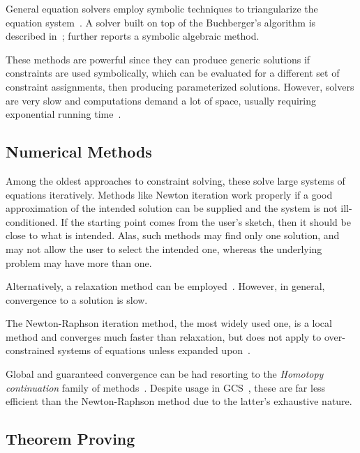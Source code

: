 General equation solvers employ symbolic techniques to triangularize the
equation system~\cite{Buchberger:1995:Grobner,Chou:1988:IWMMTPG}.  A solver
built on top of the Buchberger's algorithm is described
in~\cite{Buchanan:1993:CDS};  further reports a
symbolic algebraic method.

These methods are powerful since they can produce generic solutions if
constraints are used symbolically, which can be evaluated for a different set of
constraint assignments, then producing parameterized solutions.  However,
solvers are very slow and computations demand a lot of space, usually requiring
exponential running time~\cite{Durand:1998:SNTCS}.

\subsection{Numerical Methods}%
\label{sec:intro.constraints.numerical}

Among the oldest approaches to constraint solving, these solve large systems of
equations iteratively.  Methods like Newton iteration work properly if a good
approximation of the intended solution can be supplied and the system is not
ill-conditioned.  If the starting point comes from the user's sketch, then it
should be close to what is intended.  Alas, such methods may find only one
solution, and may not allow the user to select the intended one, whereas the
underlying problem may have more than one.

Alternatively, a relaxation method can be
employed~\cite{Borning:1989:PLATL,Hillyard:1978:CNSTDT,Sutherland:1964:Sketchpad}.
However, in general, convergence to a solution is slow.

The Newton-Raphson iteration method, the most widely used one, is a local method
and converges much faster than relaxation, but does not apply to
over-constrained systems of equations unless expanded
upon~\cite{Dedieu:2000:Newton}.

Global and guaranteed convergence can be had resorting to the \textit{Homotopy
continuation} family of methods~\cite{Allgower:1993:CPF}.  Despite usage in
\ac{GCS}~\cite{Durand:1998:SNTCS,Lamure:1996:SGCH}, these are far less efficient
than the Newton-Raphson method due to the latter's exhaustive nature.

\subsection{Theorem Proving}%
\label{sec:intro.constraints.proving}


